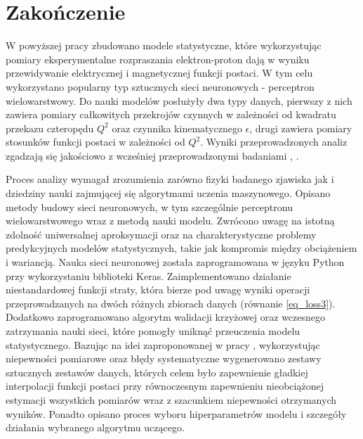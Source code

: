 \documentclass[11pt]{book}
\theoremstyle{definition}
\begin{document}
\chapter{Zakończenie}
\label{summary}

W powyższej pracy zbudowano modele statystyczne, które wykorzystując pomiary eksperymentalne rozpraszania elektron-proton dają w wyniku przewidywanie elektrycznej i magnetycznej funkcji postaci. W tym celu wykorzystano popularny typ sztucznych sieci neuronowych - perceptron wielowarstwowy. Do nauki modelów posłużyły dwa typy danych, pierwszy z nich zawiera pomiary całkowitych przekrojów czynnych w zależności od kwadratu przekazu czteropędu $Q^2$ oraz czynnika kinematycznego $\epsilon$, drugi zawiera pomiary stosunków funkcji postaci w zależności od $Q^2$. Wyniki przeprowadzonych analiz zgadzają się jakościowo z wcześniej przeprowadzonymi badaniami \cite{2009PhRvC..79f5204A}, \cite{2013PhRvC..88f5205G}.


Proces analizy wymagał zrozumienia zarówno fizyki badanego zjawiska jak i dziedziny nauki zajmującej się algorytmami uczenia maszynowego. Opisano metody budowy sieci neuronowych, w tym szczególnie perceptronu wielowarstwowego wraz z metodą nauki modelu. Zwrócono uwagę na istotną zdolność uniwersalnej aproksymacji oraz na charakterystyczne problemy predykcyjnych modelów statystycznych, takie jak kompromis między obciążeniem i wariancją. Nauka sieci neuronowej została zaprogramowana w języku Python przy wykorzystaniu biblioteki Keras. Zaimplementowano działanie niestandardowej funkcji straty, która bierze pod uwagę wyniki operacji przeprowadzanych na dwóch różnych zbiorach danych (równanie \ref{eq_loss3}). Dodatkowo zaprogramowano algorytm walidacji krzyżowej oraz wczesnego zatrzymania nauki sieci, które pomogły uniknąć przeuczenia modelu statystycznego. Bazując na idei zaproponowanej w pracy \cite{2002JHEP...05..062F}, wykorzystując niepewności pomiarowe oraz błędy systematyczne wygenerowano zestawy sztucznych zestawów danych, których celem było zapewnienie gładkiej interpolacji funkcji postaci przy równoczesnym zapewnieniu nieobciążonej estymacji wszystkich pomiarów wraz z szacunkiem niepewności otrzymanych wyników. Ponadto opisano proces wyboru hiperparametrów modelu i szczegóły działania wybranego algorytmu uczącego.
\end{document}
